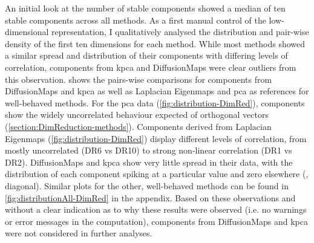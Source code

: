 An initial look at the number of stable components showed a median of ten stable components across all methods. As a first manual control of the low-dimensional representation, I qualitatively analysed the distribution and pair-wise density of the first ten dimensions for each method. While most methods showed a similar spread and distribution of their components with differing levels of correlation, components from \gls{kpca} and DiffusionMaps were clear outliers from this observation.  shows the pairs-wise comparisons for components from DiffusionMaps and \gls{kpca} as well as Laplacian Eigenmaps and \gls{pca} as references for well-behaved methods. For the \gls{pca} data (\cref{fig:distribution-DimRed}), components show the widely uncorrelated behaviour expected of orthogonal vectors (\cref{section:DimReduction-methods}). Components derived from Laplacian Eigenmaps (\cref{fig:distribution-DimRed}) display different levels of correlation, from mostly uncorrelated (DR6 vs DR10) to strong non-linear correlation (DR1 vs DR2). DiffusionMaps and \gls{kpca} show very little spread in their data, with the distribution of each component spiking at a particular value and zero elsewhere (, diagonal). Similar plots for the other, well-behaved methods can be found in \cref{fig:distributionAll-DimRed} in the appendix. Based on these observations and without a clear indication as to why these results were observed (i.e. no warnings or error messages in the computation), components from DiffusionMaps and \gls{kpca} were not considered in further analyses. 

